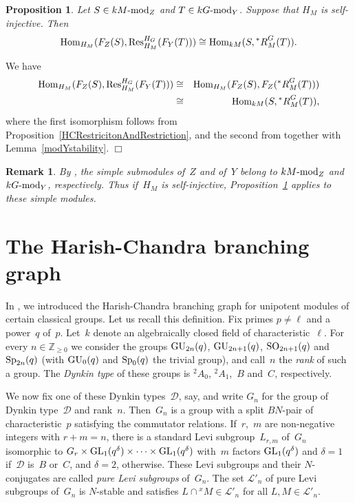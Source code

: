 \documentclass[twoside,12pt]{amsart}
\theoremstyle{plain}
\newenvironment{prf}{{\bf Proof.}}{\hfill $\Box$ \\[-1.0ex]}
\newtheorem{prp}[num]{Proposition}
\newtheorem{rem}[num]{Remark}
\begin{document}
\begin{prp}
\label{SameBranching}
Let $S \in kM\mbox{\rm -mod}_Z$ and $T \in kG\mbox{\rm -mod}_Y$. Suppose
that $H_M$ is self-injective. Then
$${\mbox{\rm Hom}}_{H_M}( F_Z(S), {\mbox{\rm Res}}^{H_G}_{H_M}( F_Y(T) ) ) \cong {\mbox{\rm Hom}}_{kM}( S, {^*R}_M^G(T) ).$$
\end{prp}
\begin{prf}
We have
\begin{eqnarray*}
{\mbox{\rm Hom}}_{H_M}( F_Z(S), {\mbox{\rm Res}}^{H_G}_{H_M}( F_Y(T) ) ) & \cong &
{\mbox{\rm Hom}}_{H_M}( F_Z(S), F_Z( {^*R}_M^G(T) ) ) \\
 & \cong & {\mbox{\rm Hom}}_{kM}( S, {^*R}_M^G(T) ),
\end{eqnarray*}
where the first isomorphism follows from 
Proposition~\ref{HCRestricitonAndRestriction}, and the second from 
\cite[Theorem 2]{Cabanes1990} together with Lemma~\ref{modYstability}.
\end{prf}

\begin{rem}
\label{SymmetricRemark}
{\rm
By \cite[Proposition~$2.3$]{GerberHissJacon2014}, the simple submodules of~$Z$
and of~$Y$ belong to $kM\mbox{\rm -mod}_Z$ and $kG\mbox{\rm -mod}_Y$, 
respectively. Thus if~$H_M$ is self-injective, Proposition~\ref{SameBranching} 
applies to these simple modules.
}
\end{rem}

\section{The Harish-Chandra branching graph}
\label{HCBranchingGraph}

In \cite[Section~4]{GerberHissJacon2014}, we introduced the Harish-Chandra 
branching graph for unipotent modules of certain classical groups. Let us 
recall this definition. Fix primes $p \neq \ell$ and a power~$q$ of~$p$. 
Let~$k$ denote an algebraically closed field of characteristic~$\ell$. For 
every $n \in \mathbb{Z}_{\geq 0}$ we consider the groups ${\mbox{\rm GU}}_{2n}(q)$, 
${\mbox{\rm GU}}_{2n+1}(q)$, ${\mbox{\rm SO}}_{2n+1}(q)$ and~${\mbox{\rm Sp}}_{2n}(q)$ (with ${\mbox{\rm GU}}_0(q)$ and 
${\mbox{\rm Sp}}_0(q)$ the trivial group), and call~$n$ the \textit{rank} of such a 
group. The \textit{Dynkin type} of these groups
is ${^2\!}A_0$, ${^2\!}A_1$,~$B$ and~$C$, respectively. 

We now fix one of these Dynkin types~$\mathcal{D}$, say, and write $G_n$
for the group of Dynkin type~$\mathcal{D}$ and rank~$n$. Then~$G_n$ is
a group with a split $BN$-pair of characteristic~$p$ satisfying the 
commutator relations. If~$r$,~$m$ are non-negative integers with $r + m = n$, 
there is a standard Levi subgroup~$L_{r,m}$ of~$G_n$
isomorphic to $G_r \times {\mbox{\rm GL}}_1(q^\delta) \times \cdots \times 
{\mbox{\rm GL}}_1(q^\delta)$ with~$m$ factors ${\mbox{\rm GL}}_1(q^\delta)$ and $\delta = 1$ 
if~$\mathcal{D}$ is~$B$ or~$C$, and $\delta = 2$, otherwise. These Levi
subgroups and their $N$-conjugates are called \textit{pure Levi subgroups} 
of~$G_n$. The set $\mathcal{L}'_n$ of pure Levi subgroups of~$G_n$ is 
$N$-stable and satisfies $L \cap {^x\!M} \in \mathcal{L}'_n$ for all
$L, M \in \mathcal{L}'_n$.
\end{document}
